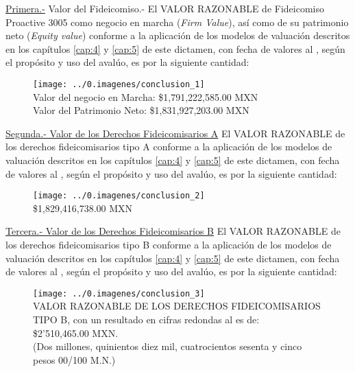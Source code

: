 \textcolor{principal}{\underline{Primera.-}} Valor del Fideicomiso.- El VALOR RAZONABLE de Fideicomiso Proactive 3005 como negocio en marcha (\textit{Firm Value}), as\'i como de su patrimonio neto (\textit{Equity value}) conforme a la aplicaci\'on de los modelos de valuaci\'on descritos en los capítulos \ref{cap:4} y \ref{cap:5} de este dictamen, con fecha de valores al \fechaValores, seg\'un el prop\'osito y uso del aval\'uo, es por la siguiente cantidad:

\begin{figure}[H]
\centering
\texttt{[image: ../0.imagenes/conclusion\_1]}\\

\textbullet Valor del negocio en Marcha: \$1,791,222,585.00 MXN\\

\textbullet Valor del Patrimonio Neto: \$1,831,927,203.00 MXN\\
\end{figure}


\textcolor{principal}{\underline{Segunda.- Valor de los Derechos Fideicomisarios A}} El \textcolor{principal}{VALOR RAZONABLE} de los derechos fideicomisarios tipo A conforme a la aplicaci\'on de los modelos de valuaci\'on descritos en los capítulos \ref{cap:4} y \ref{cap:5} de este dictamen, con fecha de valores al \fechaValores, seg\'un el prop\'osito y uso del aval\'uo, es por la siguiente cantidad:

\begin{figure}[H]
\centering
\texttt{[image: ../0.imagenes/conclusion\_2]}\\

\textbullet  \$1,829,416,738.00 MXN\\

\end{figure}



\textcolor{principal}{\underline{Tercera.- Valor de los Derechos Fideicomisarios B}} El \textcolor{principal}{VALOR RAZONABLE} de los derechos fideicomisarios tipo B conforme a la aplicaci\'on de los modelos de valuaci\'on descritos en los capítulos \ref{cap:4} y \ref{cap:5} de este dictamen, con fecha de valores al \fechaValores, seg\'un el prop\'osito y uso del aval\'uo, es por la siguiente cantidad:

\begin{figure}[H]
\centering
\texttt{[image: ../0.imagenes/conclusion\_3]}\\

VALOR RAZONABLE DE LOS DERECHOS FIDEICOMISARIOS TIPO B, con un resultado en cifras redondas al \fechaValores{} es de:\\

\$2'510,465.00 MXN.\\
(Dos millones, quinientos diez mil, cuatrocientos sesenta y cinco pesos 00/100 M.N.)
\end{figure}



